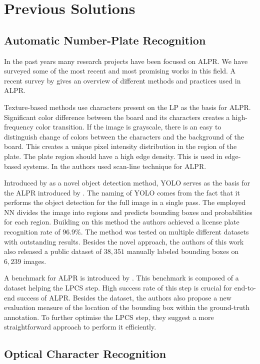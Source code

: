 \section{Previous Solutions}
\label{previous-solutions}

\subsection{Automatic Number-Plate Recognition}
\label{previous-solutions-anpr}
In the past years many research projects have been focused on \ac{ALPR}.
We have surveyed some of the most recent and most promising works in this field.
A recent survey by \cite{survOnMet} gives an overview of different methods and
practices used in \ac{ALPR}.

Texture-based methods use characters present on the \ac{LP} as the basis for
\ac{ALPR}. Significant color difference between the board and its characters
creates a high-frequency color transition. If the image is grayscale,
there is an easy to distinguish change of colors between the characters and the
background of the board. This creates a unique pixel intensity distribution in
the region of the plate. The plate region should have a high edge density. This
is used in edge-based systems. In \cite{HongFuJiaHuan} the authors used
scan-line technique for \ac{ALPR}.

Introduced by \cite{redmon2016look} as a novel object detection method,
\ac{YOLO} serves as the basis for the \ac{ALPR} introduced by
\cite{DBLP:journals/corr/abs-1909-01754}.
The naming of \ac{YOLO} comes from the fact that it performs the object detection
for the full image in a single pass. The employed \ac{NN} divides the image
into regions and predicts bounding boxes and probabilities for each region.
Building on this method the authors achieved a license plate recognition rate of
$96.9\%$.  The method was tested on multiple different datasets with outstanding
results.  Besides the novel approach, the authors of this work also released
a public dataset of $38,351$ manually labeled bounding boxes on $6,239$ images.

A benchmark for \ac{ALPR} is introduced by
\cite{DBLP:journals/corr/GoncalvesSMS16}. This benchmark is
composed of a dataset helping the \ac{LPCS} step. High success rate of this step
is crucial for end-to-end success of \ac{ALPR}. Besides the dataset, the authors
also propose a new evaluation measure of the location of the bounding
box within the ground-truth annotation. To further optimise the \ac{LPCS} step,
they suggest a more straightforward approach to perform it efficiently.

\subsection{Optical Character Recognition}
\label{previous-solutions-ocr}
